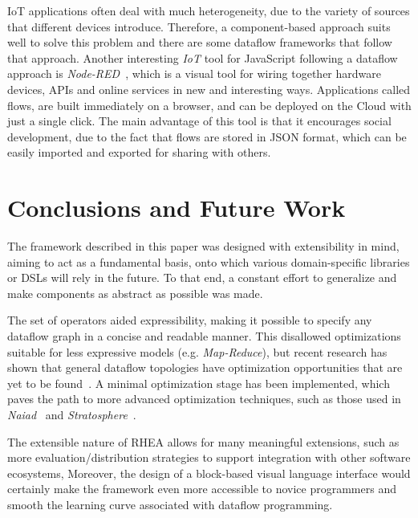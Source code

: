 \documentclass[sigplan,screen]{acmart}
\begin{document}

IoT applications often deal with much heterogeneity, due to the variety of
sources that different devices introduce. Therefore, a component-based approach
suits well to solve this problem and there are some dataflow frameworks that
follow that approach.
Another interesting \textit{IoT} tool for JavaScript following a dataflow
approach is \textit{Node-RED}~\cite{iot_dataflow}, which is a visual tool for wiring
together hardware devices, APIs and online services in new and interesting ways.
Applications called flows, are built immediately on a browser, and can be
deployed on the Cloud with just a single click. The main advantage of this tool
is that it encourages social development, due to the fact that flows are stored
in JSON format, which can be easily imported and exported for sharing with
others.

\section{Conclusions and Future Work} \label{sec:conclusions}

The framework described in this paper was designed with extensibility in mind,
aiming to act as a fundamental basis, onto which various domain-specific
libraries or DSLs will rely in the future. To that end, a constant effort to
generalize and make components as abstract as possible was made.

The set of operators aided expressibility, making it possible to specify any
dataflow graph in a concise and readable manner. This disallowed optimizations
suitable for less expressive models (e.g. \textit{Map-Reduce}), but recent
research has shown that general dataflow topologies have optimization
opportunities that are yet to be found~\cite{blackbox}. A minimal optimization
stage has been implemented, which paves the path to more advanced optimization
techniques, such as those used in \textit{Naiad}~\cite{naiad} and
\textit{Stratosphere}~\cite{blackbox}.

The extensible nature of \textsc{RHEA} allows for many meaningful extensions, such as
more evaluation/distribution strategies to support integration with other software ecosystems,
Moreover, the design of a block-based visual language interface would certainly make the
framework even more accessible to novice programmers and smooth the learning curve
associated with dataflow programming.
\end{document}
